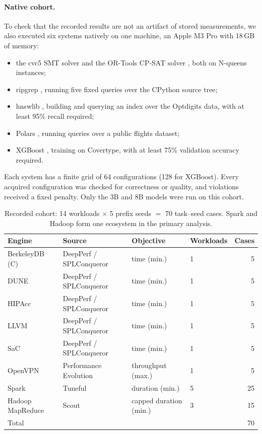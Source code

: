 \paragraph{Native cohort.} To check that the recorded results are not an artifact of stored measurements, we also executed six systems natively on one machine, an Apple M3 Pro with 18\,GB of memory:
\begin{itemize}
  \item the cvc5 SMT solver \cite{barbosa2022cvc5} and the OR-Tools CP-SAT solver \cite{perron2023ortools}, both on N-queens instances;
  \item ripgrep \cite{gallant2016ripgrep}, running five fixed queries over the CPython source tree;
  \item hnswlib \cite{malkov2020hnsw}, building and querying an index over the Optdigits data, with at least 95\% recall required;
  \item Polars \cite{vink2020polars}, running queries over a public flights dataset;
  \item XGBoost \cite{chen2016xgboost}, training on Covertype, with at least 75\% validation accuracy required.
\end{itemize}
Each system has a finite grid of 64 configurations (128 for XGBoost). Every acquired configuration was checked for correctness or quality, and violations received a fixed penalty. Only the 3B and 8B models were run on this cohort.

\begin{table}[t]
\centering
\caption{Recorded cohort: 14 workloads $\times$ 5 prefix seeds $=$ 70 task--seed cases. Spark and Hadoop form one ecosystem in the primary analysis.}
\label{tab:cohort}
\small
\begin{tabular}{llllr}
\toprule
Engine & Source & Objective & Workloads & Cases \\
\midrule
BerkeleyDB (C) & DeepPerf / SPLConqueror & time (min.) & 1 & 5 \\
DUNE & DeepPerf / SPLConqueror & time (min.) & 1 & 5 \\
HIPAcc & DeepPerf / SPLConqueror & time (min.) & 1 & 5 \\
LLVM & DeepPerf / SPLConqueror & time (min.) & 1 & 5 \\
SaC & DeepPerf / SPLConqueror & time (min.) & 1 & 5 \\
OpenVPN & Performance Evolution & throughput (max.) & 1 & 5 \\
Spark & Tuneful & duration (min.) & 5 & 25 \\
Hadoop MapReduce & Scout & capped duration (min.) & 3 & 15 \\
\midrule
Total & & & & 70 \\
\bottomrule
\end{tabular}
\end{table}

